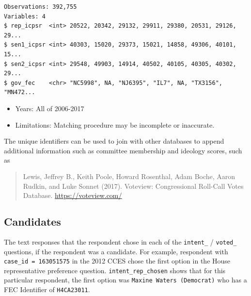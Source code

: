 \documentclass[10pt,article,oneside]{memoir}
\theoremstyle{definition}
\newenvironment{Shaded}{\begin{snugshade}}{\end{snugshade}}
\newcommand{\KeywordTok}[1]{\textcolor[rgb]{0.13,0.29,0.53}{\textbf{#1}}}
\newcommand{\DecValTok}[1]{\textcolor[rgb]{0.00,0.00,0.81}{#1}}
\newcommand{\StringTok}[1]{\textcolor[rgb]{0.31,0.60,0.02}{#1}}
\newcommand{\OperatorTok}[1]{\textcolor[rgb]{0.81,0.36,0.00}{\textbf{#1}}}
\newcommand{\NormalTok}[1]{#1}
\begin{document}
\begin{verbatim}
Observations: 392,755
Variables: 4
$ rep_icpsr  <int> 20522, 20342, 29132, 29911, 29380, 20531, 29126, 29...
$ sen1_icpsr <int> 40303, 15020, 29373, 15021, 14858, 49306, 40101, 15...
$ sen2_icpsr <int> 29548, 49903, 14914, 40502, 40105, 40305, 40302, 29...
$ gov_fec    <chr> "NC5998", NA, "NJ6395", "IL7", NA, "TX3156", "MN472...
\end{verbatim}

\begin{itemize}
\tightlist
\item
  Years: All of 2006-2017
\item
  Limitations: Matching procedure may be incomplete or inaccurate.
\end{itemize}

The unique identifiers can be used to join with other databases to
append additional information such as committee membership and ideology
scores, such as

\begin{quote}
Lewis, Jeffrey B., Keith Poole, Howard Rosenthal, Adam Boche, Aaron
Rudkin, and Luke Sonnet (2017). Voteview: Congressional Roll-Call Votes
Database. \url{https://voteview.com/}
\end{quote}

\subsection{Candidates}\label{candidates}

The text responses that the respondent chose in each of the
\texttt{intent\_} / \texttt{voted\_} questions, if the respondent was a
candidate. For example, respondent with \texttt{case\_id\ =\ 163051575}
in the 2012 CCES chose the first option in the House representative
preference question. \texttt{intent\_rep\_chosen} shows that for this
particular respondent, the first option was
\texttt{Maxine\ Waters\ (Democrat)} who has a FEC Identifier of
\texttt{H4CA23011}.

\begin{Shaded}
\end{Shaded}
\end{document}
